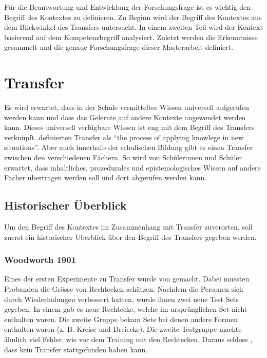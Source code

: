 

Für die Beantwortung und Entwicklung der Forschungsfrage ist es wichtig den Begriff des Kontextes zu definieren. Zu Beginn wird der Begriff des Kontextes aus dem Blickwinkel des Transfers untersucht. In einem zweiten Teil wird der Kontext basierend auf dem Kompetenzbegriff analysiert. Zuletzt werden die Erkenntnisse gesammelt und die genaue Forschungsfrage dieser Masterarbeit definiert.

\section{Transfer}

Es wird erwartet, dass in der Schule vermitteltes Wissen universell aufgerufen werden kann und dass das Gelernte auf andere Kontexte angewendet werden kann. Dieses universell verfügbare Wissen ist eng mit dem Begriff des Transfers verknüpft. \citet{Greeno1996} definierten Transfer als "`the process of applying knowlege in new situations"'. Aber auch innerhalb der schulischen Bildung gibt es einen Transfer zwischen den verschiedenen Fächern. So wird von Schülerinnen und Schüler erwartet, dass inhaltliches, prozedurales und epistemologisches Wissen auf andere Fächer übertragen werden soll und dort abgerufen werden kann.

\subsection{Historischer Überblick}

Um den Begriff des Kontextes im Zusammenhang mit Transfer zuverorten, soll zuerst ein historischer Überblick über den Begriff des Transfers gegeben werden.


\subsubsection{Woodworth 1901}

Eines der ersten Experimente zu Transfer wurde von \citet{Woodworth1901} gemacht. Dabei mussten Probanden die Grösse von Rechtecken schätzen. Nachdem die Personen sich durch Wiederholungen verbessert hatten, wurde ihnen zwei neue Test Sets gegeben. In einem gab es neue Rechtecke, welche im ursprünglichen Set nicht enthalten waren. Die zweite Gruppe bekam Sets bei denen andere Formen enthalten waren (z. B. Kreise und Dreiecke). Die zweite Testgruppe machte ähnlich viel Fehler, wie vor dem Training mit den Rechtecken. Daraus schloss \citeauthor{Woodworth1901}, dass kein Transfer stattgefunden haben kann.

